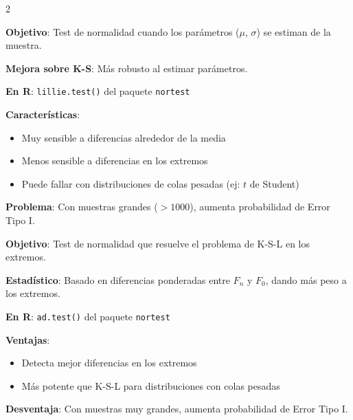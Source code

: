 \documentclass[10pt,a4paper]{article}
\begin{document}
\begin{multicols}{2}
    \begin{tcolorbox}[title=Test de Lilliefors (K-S-L), equal height group=BA3]
        \textbf{Objetivo}: Test de normalidad cuando los parámetros ($\mu$, $\sigma$) se estiman de la muestra.
        
        \textbf{Mejora sobre K-S}: Más robusto al estimar parámetros.
        
        \textbf{En R}: \texttt{lillie.test()} del paquete \texttt{nortest}
        
        \textbf{Características}:
        \begin{itemize}
            \item Muy sensible a diferencias alrededor de la media
            \item Menos sensible a diferencias en los extremos
            \item Puede fallar con distribuciones de colas pesadas (ej: $t$ de Student)
        \end{itemize}
        
        \textbf{Problema}: Con muestras grandes ($> 1000$), aumenta probabilidad de Error Tipo I.
    \end{tcolorbox}
    \begin{tcolorbox}[title=Test de Anderson-Darling (A-D), equal height group=BA3]
        \textbf{Objetivo}: Test de normalidad que resuelve el problema de K-S-L en los extremos.
        
        \textbf{Estadístico}: Basado en diferencias ponderadas entre $F_n$ y $F_0$, dando más peso a los extremos.
        
        \textbf{En R}: \texttt{ad.test()} del paquete \texttt{nortest}
        
        \textbf{Ventajas}:
        \begin{itemize}
            \item Detecta mejor diferencias en los extremos
            \item Más potente que K-S-L para distribuciones con colas pesadas
        \end{itemize}
        
        \textbf{Desventaja}: Con muestras muy grandes, aumenta probabilidad de Error Tipo I.
    \end{tcolorbox}
\end{multicols}
\end{document}
